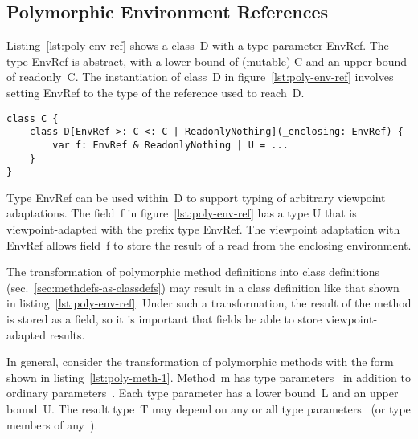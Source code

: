 \subsection{Polymorphic Environment References}

%


Listing~\ref{lst:poly-env-ref} shows a class~{\cd D} with a type parameter {\cd EnvRef}. The type {\cd EnvRef} is abstract, with a lower bound of (mutable) {\cd C} and an upper bound of readonly~{\cd C}. The instantiation of class~{\cd D} in figure~\ref{lst:poly-env-ref} involves setting {\cd EnvRef} to the type of the reference used to reach~{\cd D}.

\begin{lstlisting}[float=htbp, caption={Polymorphic Environment Reference}, label={lst:poly-env-ref}]
class C {
	class D[EnvRef >: C <: C | ReadonlyNothing](_enclosing: EnvRef) {
		var f: EnvRef & ReadonlyNothing | U = ...
	}
}
\end{lstlisting}

Type {\cd EnvRef} can be used within~{\cd D} to support typing of arbitrary viewpoint adaptations. The field~{\cd f} in figure~\ref{lst:poly-env-ref} has a type {\cd U} that is viewpoint-adapted with the prefix type {\cd EnvRef}. The viewpoint adaptation with {\cd EnvRef} allows field~{\cd f} to store the result of a read from the enclosing environment.

The transformation of polymorphic method definitions into class definitions (sec.~\ref{sec:methdefs-as-classdefs}) may result in a class definition like that shown in listing~\ref{lst:poly-env-ref}. Under such a transformation, the result of the method is stored as a field, so it is important that fields be able to store viewpoint-adapted results.

In general, consider the transformation of polymorphic methods with the form shown in listing~\ref{lst:poly-meth-1}. Method~{\cd m} has type parameters~{\cd {}} in addition to ordinary parameters~{\cd {}}. Each type parameter has a lower bound~{\cd L} and an upper bound~{\cd U}. The result type~{\cd T} may depend on any or all type parameters~{\cd {}} (or type members of any~{\cd {}}).

